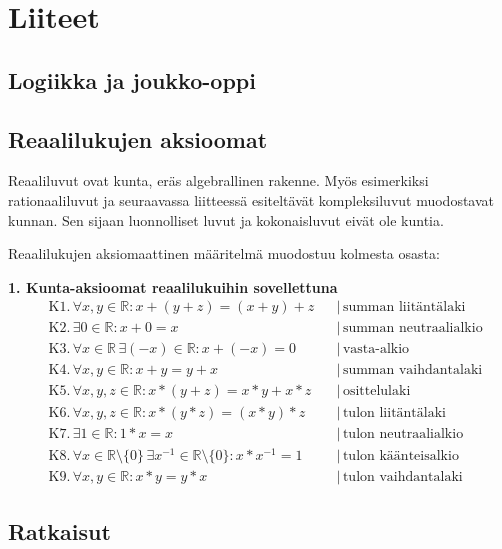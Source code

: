 \part{Liiteet}
\chapter{Logiikka ja joukko-oppi}
\chapter{Reaalilukujen aksioomat}
Reaaliluvut ovat kunta, eräs algebrallinen rakenne. Myös esimerkiksi rationaaliluvut ja seuraavassa liitteessä esiteltävät kompleksiluvut muodostavat kunnan. Sen sijaan luonnolliset luvut ja kokonaisluvut eivät ole kuntia.

Reaalilukujen aksiomaattinen määritelmä muodostuu kolmesta osasta:

\textbf{1. Kunta-aksioomat reaalilukuihin sovellettuna} \\
\begin{align*}
&\text{K1.} \, \forall x, y \in \mathbb{R}: x+(y+z) = (x+y)+z & &| \, \text{summan liitäntälaki} \\
&\text{K2.} \, \exists 0 \in \mathbb{R}: x+0 = x & &| \, \text{summan neutraalialkio} \\
&\text{K3.} \, \forall x \in \mathbb{R} \, \exists (-x) \in \mathbb{R}: x+(-x)=0 & &| \, \text{vasta-alkio} \\
&\text{K4.} \, \forall x, y \in \mathbb{R}: x+y = y+x & &| \, \text{summan vaihdantalaki} \\
&\text{K5.} \, \forall x, y, z \in \mathbb{R}: x*(y+z) = x*y + x*z & &| \, \text{osittelulaki} \\
&\text{K6.} \, \forall x, y, z \in \mathbb{R}: x*(y*z) = (x*y)*z & &| \, \text{tulon liitäntälaki} \\
&\text{K7.} \, \exists 1 \in \mathbb{R}: 1*x = x & &| \, \text{tulon neutraalialkio} \\
&\text{K8.} \, \forall x \in \mathbb{R} \setminus \{0\} \, \exists x^{-1} \in \mathbb{R} \setminus \{0\}: x*x^{-1}=1 & &| \, \text{tulon käänteisalkio} \\
&\text{K9.} \, \forall x, y \in \mathbb{R}: x*y = y*x & &| \, \text{tulon vaihdantalaki}
\end{align*}

\chapter{Ratkaisut}
